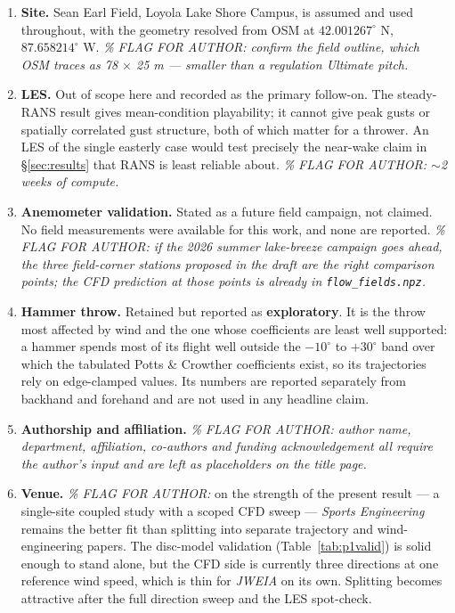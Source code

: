 \documentclass[11pt,letterpaper]{article}
\begin{document}
\begin{enumerate}[leftmargin=*,itemsep=3pt]
  \item \textbf{Site.} Sean Earl Field, Loyola Lake Shore Campus, is assumed
    and used throughout, with the geometry resolved from OSM at
    $42.001267^\circ$ N, $87.658214^\circ$ W. \emph{\% FLAG FOR AUTHOR: confirm
    the field outline, which OSM traces as 78 $\times$ 25 m --- smaller than a
    regulation Ultimate pitch.}

  \item \textbf{LES.} Out of scope here and recorded as the primary follow-on.
    The steady-RANS result gives mean-condition playability; it cannot give
    peak gusts or spatially correlated gust structure, both of which matter for
    a thrower. An LES of the single easterly case would test precisely the
    near-wake claim in \S\ref{sec:results} that RANS is least reliable about.
    \emph{\% FLAG FOR AUTHOR: $\sim$2 weeks of compute.}

  \item \textbf{Anemometer validation.} Stated as a future field campaign, not
    claimed. No field measurements were available for this work, and none are
    reported. \emph{\% FLAG FOR AUTHOR: if the 2026 summer lake-breeze campaign
    goes ahead, the three field-corner stations proposed in the draft are the
    right comparison points; the CFD prediction at those points is already in
    \texttt{flow\_fields.npz}.}

  \item \textbf{Hammer throw.} Retained but reported as \textbf{exploratory}.
    It is the throw most affected by wind and the one whose coefficients are
    least well supported: a hammer spends most of its flight well outside the
    $-10^\circ$ to $+30^\circ$ band over which the tabulated Potts \& Crowther
    coefficients exist, so its trajectories rely on edge-clamped values. Its
    numbers are reported separately from backhand and forehand and are not used
    in any headline claim.

  \item \textbf{Authorship and affiliation.}
    \emph{\% FLAG FOR AUTHOR: author name, department, affiliation, co-authors
    and funding acknowledgement all require the author's input and are left as
    placeholders on the title page.}

  \item \textbf{Venue.} \emph{\% FLAG FOR AUTHOR:} on the strength of the
    present result --- a single-site coupled study with a scoped CFD sweep ---
    \emph{Sports Engineering} remains the better fit than splitting into
    separate trajectory and wind-engineering papers. The disc-model validation
    (Table~\ref{tab:p1valid}) is solid enough to stand alone, but the CFD side
    is currently three directions at one reference wind speed, which is thin
    for \emph{JWEIA} on its own. Splitting becomes attractive after the full
    direction sweep and the LES spot-check.
\end{enumerate}
\end{document}
